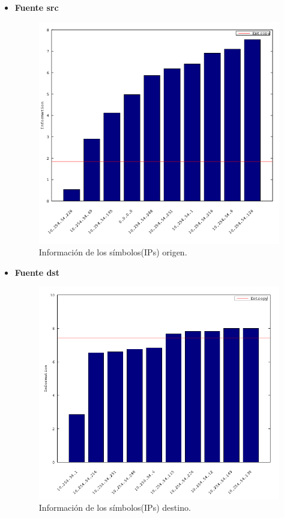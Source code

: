 \documentclass[10pt, a4paper]{article}
\begin{document}
\begin{itemize}
\item \textbf{Fuente src}

\begin{figure}[H] %
\begin{center}
\includegraphics[width=400pt]{../imgs/starbucks_src_chartbar.png}
\caption{Información de los símbolos(IPs) origen.}
\end{center}
\end{figure}

\item \textbf{Fuente dst}

\begin{figure}[H] %
\begin{center}
\includegraphics[width=400pt]{../imgs/starbucks_dst_chartbar.png}
\caption{Información de los símbolos(IPs) destino.}
\end{center}
\end{figure}


\end{itemize}
\end{document}

